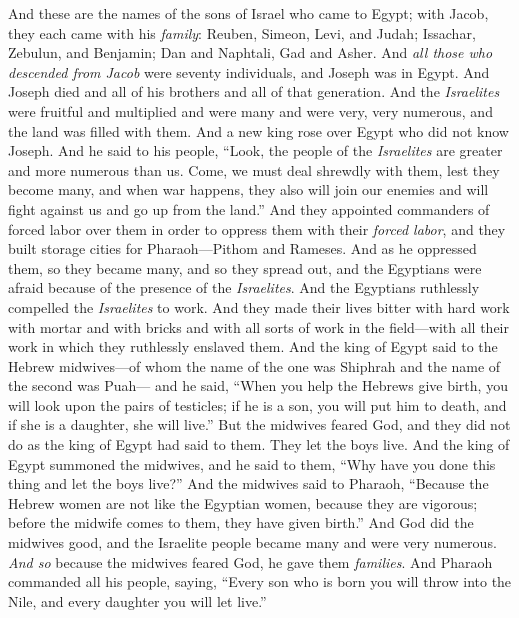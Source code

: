 
\begin{biblechapter} %
 And these are the names of the sons of Israel who came to Egypt; with Jacob, they each came with his \textit{family}:
\verse Reuben, Simeon, Levi, and Judah;
\verse Issachar, Zebulun, and Benjamin;
\verse Dan and Naphtali, Gad and Asher.
\verse And \textit{all those who descended from Jacob} were seventy individuals, and Joseph was in Egypt.
\verse And Joseph died and all of his brothers and all of that generation.
\verse And the \textit{Israelites} were fruitful and multiplied and were many and were very, very numerous, and the land was filled with them.
\verse And a new king rose over Egypt who did not know Joseph.
\verse And he said to his people, “Look, the people of the \textit{Israelites} are greater and more numerous than us.
\verse Come, we must deal shrewdly with them, lest they become many, and when war happens, they also will join our enemies and will fight against us and go up from the land.”
\verse And they appointed commanders of forced labor over them in order to oppress them with their \textit{forced labor}, and they built storage cities for Pharaoh—Pithom and Rameses.
\verse And as he oppressed them, so they became many, and so they spread out, and the Egyptians were afraid because of the presence of the \textit{Israelites}.
\verse And the Egyptians ruthlessly compelled the \textit{Israelites} to work.
\verse And they made their lives bitter with hard work with mortar and with bricks and with all sorts of work in the field—with all their work in which they ruthlessly enslaved them.
\verse And the king of Egypt said to the Hebrew midwives—of whom the name of the one was Shiphrah and the name of the second was Puah—
\verse and he said, “When you help the Hebrews give birth, you will look upon the pairs of testicles; if he is a son, you will put him to death, and if she is a daughter, she will live.”
\verse But the midwives feared God, and they did not do as the king of Egypt had said to them. They let the boys live.
\verse And the king of Egypt summoned the midwives, and he said to them, “Why have you done this thing and let the boys live?”
\verse And the midwives said to Pharaoh, “Because the Hebrew women are not like the Egyptian women, because they are vigorous; before the midwife comes to them, they have given birth.”
\verse And God did the midwives good, and the Israelite people became many and were very numerous.
\verse \textit{And so} because the midwives feared God, he gave them \textit{families}.
\verse And Pharaoh commanded all his people, saying, “Every son who is born you will throw into the Nile, and every daughter you will let live.”
\end{biblechapter}

